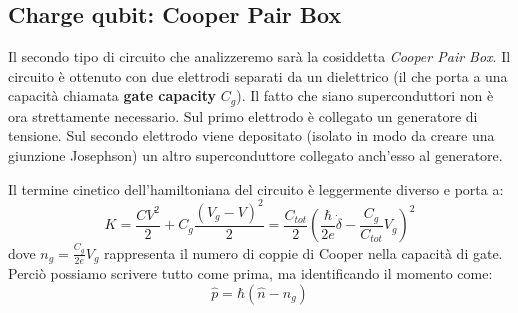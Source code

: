 \subsection{Charge qubit: Cooper Pair Box}

Il secondo tipo di circuito che analizzeremo sarà la cosiddetta  \textit{Cooper Pair Box}.
Il circuito è ottenuto con due elettrodi separati da un dielettrico (il che porta a una capacità chiamata \textbf{gate capacity} $C_g$). Il fatto che siano superconduttori non è ora strettamente necessario.
Sul primo elettrodo è collegato un generatore di tensione. Sul secondo elettrodo viene depositato (isolato in modo da creare una giunzione Josephson) un altro superconduttore collegato anch'esso al generatore.

\begin{figure}[!ht]
    \centering
    \qquad
\end{figure}
\noindent Il termine cinetico dell'hamiltoniana del circuito è leggermente diverso e porta a:
\begin{equation*}
K =\frac{CV^2}{2}+ C_g \frac{(V_g - V)^2}{2} = \frac{C_{tot}}{2} \left( \frac{\hbar }{2e}\dot \delta - \frac{C_g}{C_{tot}}V_g \right) ^2 
\end{equation*}
dove $n_g = \frac{C_g}{2e}V_g$  rappresenta il numero di coppie di Cooper nella capacità di gate.
Perciò possiamo scrivere tutto come prima, ma identificando il momento come:
\begin{equation*}
    \hat p = \hbar(\hat n-n_g)
\end{equation*}
